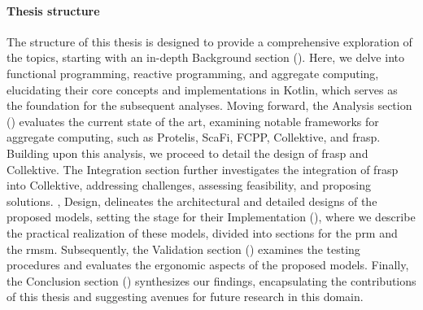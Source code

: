 \paragraph{Thesis structure}

The structure of this thesis is designed to provide a comprehensive exploration of the topics, starting with an in-depth Background section (). Here, we delve into functional programming, reactive programming, and aggregate computing, elucidating their core concepts and implementations in Kotlin, which serves as the foundation for the subsequent analyses. Moving forward, the Analysis section () evaluates the current state of the art, examining notable frameworks for aggregate computing, such as Protelis, ScaFi, FCPP, Collektive, and \ac{frasp}. Building upon this analysis, we proceed to detail the design of \ac{frasp} and Collektive. The Integration section further investigates the integration of \ac{frasp} into Collektive, addressing challenges, assessing feasibility, and proposing solutions. , Design, delineates the architectural and detailed designs of the proposed models, setting the stage for their Implementation (), where we describe the practical realization of these models, divided into sections for the \ac{prm} and the \ac{rmsm}. Subsequently, the Validation section () examines the testing procedures and evaluates the ergonomic aspects of the proposed models. Finally, the Conclusion section () synthesizes our findings, encapsulating the contributions of this thesis and suggesting avenues for future research in this domain.
